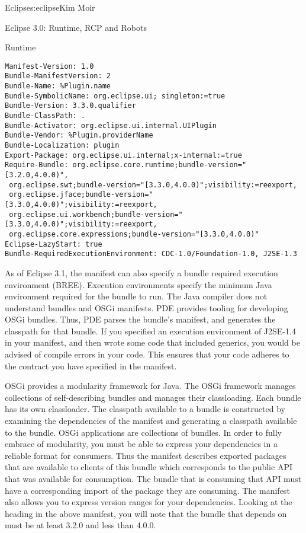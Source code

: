 \begin{aosachapter}{Eclipse}{s:eclipse}{Kim Moir}
\begin{aosasect1}{Eclipse 3.0: Runtime, RCP and Robots}
\begin{aosasect2}{Runtime}
\begin{verbatim}
Manifest-Version: 1.0
Bundle-ManifestVersion: 2
Bundle-Name: %Plugin.name
Bundle-SymbolicName: org.eclipse.ui; singleton:=true
Bundle-Version: 3.3.0.qualifier
Bundle-ClassPath: .
Bundle-Activator: org.eclipse.ui.internal.UIPlugin
Bundle-Vendor: %Plugin.providerName
Bundle-Localization: plugin
Export-Package: org.eclipse.ui.internal;x-internal:=true
Require-Bundle: org.eclipse.core.runtime;bundle-version="[3.2.0,4.0.0)",
 org.eclipse.swt;bundle-version="[3.3.0,4.0.0)";visibility:=reexport,
 org.eclipse.jface;bundle-version="[3.3.0,4.0.0)";visibility:=reexport,
 org.eclipse.ui.workbench;bundle-version="[3.3.0,4.0.0)";visibility:=reexport,
 org.eclipse.core.expressions;bundle-version="[3.3.0,4.0.0)"
Eclipse-LazyStart: true
Bundle-RequiredExecutionEnvironment: CDC-1.0/Foundation-1.0, J2SE-1.3
\end{verbatim}

As of Eclipse 3.1, the manifest can also specify a bundle required
execution environment (BREE). Execution environments specify the
minimum Java environment required for the bundle to run. The Java
compiler does not understand bundles and OSGi manifests. PDE provides
tooling for developing OSGi bundles. Thus, PDE parses the bundle's
manifest, and generates the classpath for that bundle. If you
specified an execution environment of J2SE-1.4 in your manifest, and
then wrote some code that included generics, you would be advised of
compile errors in your code. This ensures that your code adheres to
the contract you have specified in the manifest.

OSGi provides a modularity framework for Java. The OSGi framework
manages collections of self-describing bundles and manages their
classloading. Each bundle has its own classloader. The classpath
available to a bundle is constructed by examining the dependencies of
the manifest and generating a classpath available to the bundle. OSGi
applications are collections of bundles. In order to fully embrace of
modularity, you must be able to express your dependencies in a
reliable format for consumers. Thus the manifest describes exported
packages that are available to clients of this bundle which
corresponds to the public API that was available for consumption.  The
bundle that is consuming that API must have a corresponding import of
the package they are consuming. The manifest also allows you to
express version ranges for your dependencies.  Looking at
the  heading in the above manifest, you will note
that the  bundle that
 depends on must be at least 3.2.0 and less than
4.0.0.


\end{aosasect2}
\end{aosasect1}
\end{aosachapter}
